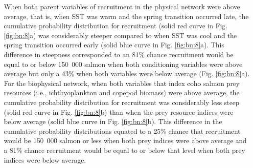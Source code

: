 When both parent variables of recruitment in the physical network were above
average, that is, when SST was warm and the spring transition occurred late, the
cumulative probability distribution for recruitment (solid red curve in Fig.
\ref{fig:bn:8}a) was considerably steeper compared to when SST was cool and the
spring transition occurred early (solid blue curve in Fig. \ref{fig:bn:8}a).
This difference in steepness corresponded to an 81\% chance recruitment would be
equal to or below 150~000 salmon when both conditioning variables were above
average but only a 43\% when both variables were below average (Fig.
\ref{fig:bn:8}a). For the biophysical network, when both variables that index
coho salmon prey resources (i.e., ichthyoplankton and copepod biomass) were
above average, the cumulative probability distribution for recruitment was
considerably less steep (solid red curve in Fig. \ref{fig:bn:8}b) than when the
prey resource indices were below average (solid blue curve in Fig.
\ref{fig:bn:8}b). This difference in the cumulative probability distributions
equated to a 25\% chance that recruitment would be 150~000 salmon or less when
both prey indices were above average and a 81\% chance recruitment would be
equal to or below that level when both prey indices were below average.

